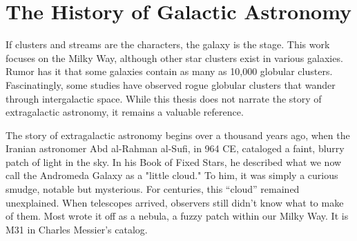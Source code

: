 \section{The History of Galactic Astronomy}

If clusters and streams are the characters, the galaxy is the stage. This work focuses on the Milky Way, although other star clusters exist in various galaxies. Rumor has it that some galaxies contain as many as 10,000 globular clusters. Fascinatingly, some studies have observed rogue globular clusters that wander through intergalactic space. While this thesis does not narrate the story of extragalactic astronomy, it remains a valuable reference. 



The story of extragalactic astronomy begins over a thousand years ago, when the Iranian astronomer Abd al-Rahman al-Sufi, in 964 CE, cataloged a faint, blurry patch of light in the sky. In his Book of Fixed Stars, he described what we now call the Andromeda Galaxy as a "little cloud." To him, it was simply a curious smudge, notable but mysterious. For centuries, this “cloud” remained unexplained. When telescopes arrived, observers still didn't know what to make of them. Most wrote it off as a nebula, a fuzzy patch within our Milky Way. It is M31 in Charles Messier's catalog. 

